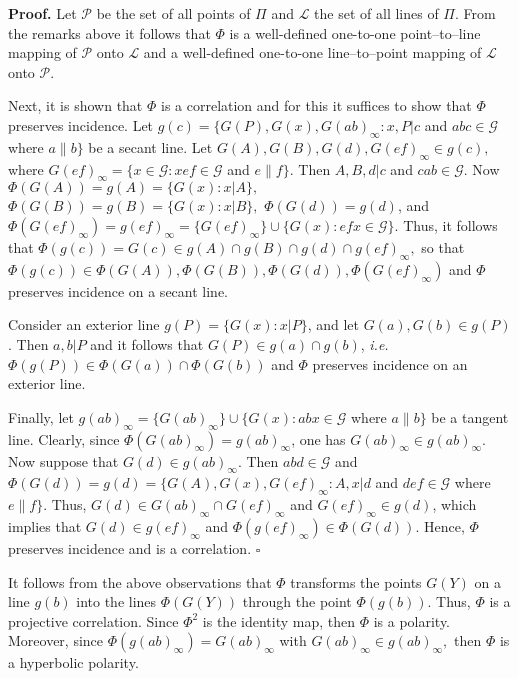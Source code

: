 \documentclass[a4paper,twoside,12pt]{article}
\newenvironment{proof}{\medskip \noindent 
            {\bf Proof.}}{ \hfill $\square$ \medskip}
\begin{document}
\begin{proof} Let $\mathcal{P}$ be the set of all points of $\Pi$ and 
$\mathcal{L}$ the set of all lines of $\Pi$. From the remarks above
it follows that $\Phi$ is a well-defined one-to-one point--to--line mapping
of $\mathcal{P}$ onto $\mathcal{L}$ and a well-defined one-to-one
line--to--point mapping of $\mathcal{L}$ onto $\mathcal{P}$. 

     Next, it is shown that $\Phi$ is a correlation and for this it 
suffices to show that $\Phi$ preserves incidence. Let 
$g(c)=\{G(P),G(x),G(ab)_{\infty }:x,P|c$ and $abc\in \mathcal{G}$
where $a\parallel b\}$ be a secant line. Let 
$G(A),G(B),G(d),G(ef)_{\infty }\in g(c),$ where 
$G(ef)_{\infty }=\{x\in \mathcal{G}:xef\in \mathcal{G}$ and 
$e\parallel f\}.$ Then $A,B,d|c$ and $cab\in \mathcal{G}.$ Now 
$\Phi(G(A))=g(A)=\{G(x):x|A\},$ $\Phi(G(B))=g(B)=\{G(x):x|B\},$ 
$\Phi(G(d))=g(d)$, and $\Phi(G(ef)_{\infty })= g(ef)_{\infty }=\{G(ef)_{\infty
}\}\cup \{G(x):efx\in \mathcal{G}\}.$ Thus, it follows that 
$\Phi(g(c))=G(c)\in g(A)\cap g(B)\cap g(d)\cap g(ef)_{\infty },$ so that 
$\Phi(g(c))\in \Phi(G(A)),\Phi(G(B)),\Phi(G(d)),\Phi(G(ef)_{\infty })$ 
and $\Phi$ preserves incidence on a secant line.

     Consider an exterior line $g(P)=\{G(x):x|P\}$, and let 
$G(a),G(b)\in g(P)$. Then $a,b|P$ and it follows that 
$G(P)\in g(a)\cap g(b)$, {\it i.e.} 
$\Phi(g(P))\in \Phi(G(a))\cap \Phi(G(b))$ and $\Phi$ preserves incidence
on an exterior line.

     Finally, let $g(ab)_{\infty }=\{G(ab)_{\infty }\}\cup \{G(x):abx\in 
\mathcal{G}$ where $a\parallel b\}$ be a tangent line. Clearly, since 
$\Phi(G(ab)_{\infty })=g(ab)_{\infty }$, one has 
$G(ab)_{\infty }\in g(ab)_{\infty }$. 
Now suppose that $G(d)\in g(ab)_{\infty }.$ Then $abd\in \mathcal{G}$ and
$\Phi(G(d))=g(d)=\{G(A),G(x),G(ef)_{\infty}:A,x|d$ and $def\in \mathcal{G}$ 
where $e\parallel f\}.$ Thus, $G(d)\in G(ab)_{\infty }\cap G(ef)_{\infty}$ 
and $G(ef)_{\infty }\in g(d)$, which implies that $G(d)\in g(ef)_{\infty}$ 
and $\Phi(g(ef)_{\infty })\in \Phi(G(d))$. Hence, $\Phi$
preserves incidence and is a correlation.
\end{proof}

     It follows from the above observations that $\Phi$ transforms
the points $G(Y)$ on a line $g(b)$ into the lines $\Phi(G(Y))$
through the point $\Phi(g(b))$. Thus, $\Phi$ is a projective
correlation. Since $\Phi^{2}$ is the identity map, then $\Phi$ is a
polarity. Moreover, since $\Phi(g(ab)_{\infty})=G(ab)_{\infty }$
with $G(ab)_{\infty}\in g(ab)_{\infty},$ then $\Phi$ is a
hyperbolic polarity.
\end{document}
